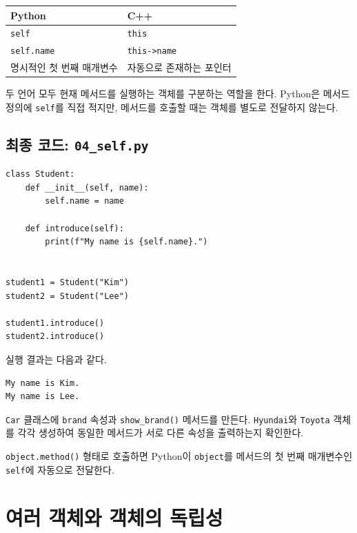 \documentclass[11pt,a4paper]{article}
\begin{document}
\begin{center}
\begin{tabular}{ll}
\toprule
Python & C++ \\
\midrule
\texttt{self} & \texttt{this} \\
\texttt{self.name} & \texttt{this->name} \\
명시적인 첫 번째 매개변수 & 자동으로 존재하는 포인터 \\
\bottomrule
\end{tabular}
\end{center}

두 언어 모두 현재 메서드를 실행하는 객체를 구분하는 역할을 한다. Python은 메서드 정의에 \texttt{self}를 직접 적지만, 메서드를 호출할 때는 객체를 별도로 전달하지 않는다.

\subsection{최종 코드: \texttt{04\_self.py}}

\begin{lstlisting}
class Student:
    def __init__(self, name):
        self.name = name

    def introduce(self):
        print(f"My name is {self.name}.")


student1 = Student("Kim")
student2 = Student("Lee")

student1.introduce()
student2.introduce()
\end{lstlisting}

실행 결과는 다음과 같다.

\begin{verbatim}
My name is Kim.
My name is Lee.
\end{verbatim}

\begin{practicebox}
\texttt{Car} 클래스에 \texttt{brand} 속성과 \texttt{show\_brand()} 메서드를 만든다. \texttt{Hyundai}와 \texttt{Toyota} 객체를 각각 생성하여 동일한 메서드가 서로 다른 속성을 출력하는지 확인한다.
\end{practicebox}

\begin{importantbox}
\texttt{object.method()} 형태로 호출하면 Python이 \texttt{object}를 메서드의 첫 번째 매개변수인 \texttt{self}에 자동으로 전달한다.
\end{importantbox}

\section{여러 객체와 객체의 독립성}
\end{document}
